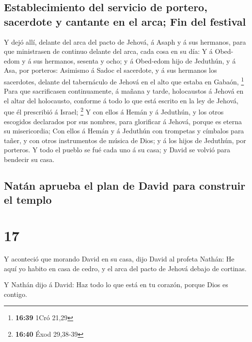 \hypertarget{establecimiento-del-servicio-de-portero-sacerdote-y-cantante-en-el-arca-fin-del-festival}{%
\subsection{Establecimiento del servicio de portero, sacerdote y
cantante en el arca; Fin del
festival}\label{establecimiento-del-servicio-de-portero-sacerdote-y-cantante-en-el-arca-fin-del-festival}}

 Y dejó allí, delante del arca del pacto de Jehová, á Asaph
y á sus hermanos, para que ministrasen de continuo delante del arca,
cada cosa en su día:  Y á Obed-edom y á sus hermanos,
sesenta y ocho; y á Obed-edom hijo de Jeduthún, y á Asa, por porteros:
 Asimismo á Sadoc el sacerdote, y á sus hermanos los
sacerdotes, delante del tabernáculo de Jehová en el alto que estaba en
Gabaón, \footnote{\textbf{16:39} 1Cró 21,29}  Para que
sacrificasen continuamente, á mañana y tarde, holocaustos á Jehová en el
altar del holocausto, conforme á todo lo que está escrito en la ley de
Jehová, que él prescribió á Israel; \footnote{\textbf{16:40} Éxod
  29,38-39}  Y con ellos á Hemán y á Jeduthún, y los otros
escogidos declarados por sus nombres, para glorificar á Jehová, porque
es eterna su misericordia;  Con ellos á Hemán y á Jeduthún
con trompetas y címbalos para tañer, y con otros instrumentos de música
de Dios; y á los hijos de Jeduthún, por porteros.  Y todo
el pueblo se fué cada uno á su casa; y David se volvió para bendecir su
casa.

\hypertarget{natuxe1n-aprueba-el-plan-de-david-para-construir-el-templo}{%
\subsection{Natán aprueba el plan de David para construir el
templo}\label{natuxe1n-aprueba-el-plan-de-david-para-construir-el-templo}}

\hypertarget{section-16}{%
\section{17}\label{section-16}}

 Y aconteció que morando David en su casa, dijo David al
profeta Nathán: He aquí yo habito en casa de cedro, y el arca del pacto
de Jehová debajo de cortinas.

 Y Nathán dijo á David: Haz todo lo que está en tu corazón,
porque Dios es contigo.

